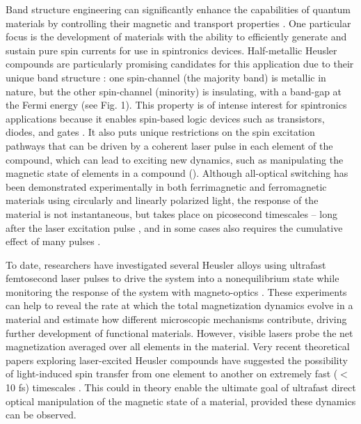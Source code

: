 Band structure engineering can significantly enhance the capabilities of quantum materials by controlling their magnetic and transport properties \cite{He2017,Klaer2009}. One particular focus is the development of materials with the ability to efficiently generate and sustain pure spin currents for use in spintronics devices. Half-metallic Heusler compounds are particularly promising candidates for this application due to their unique band structure \cite{Muller2009, Mann2012}: one spin-channel (the majority band) is metallic in nature, but the other spin-channel (minority) is insulating, with a band-gap at the Fermi energy (see Fig. 1). This property is of intense interest for spintronics applications because it enables spin-based logic devices such as transistors, diodes, and gates \cite{Prinz1995}. It also puts unique restrictions on the spin excitation pathways that can be driven by a coherent laser pulse in each element of the compound, which can lead to exciting new dynamics, such as manipulating the magnetic state of elements in a compound (\cite{Elliott2016,Steil2010}). Although all-optical switching has been demonstrated experimentally in both ferrimagnetic and ferromagnetic materials using circularly and linearly polarized light, the response of the material is not instantaneous, but takes place on picosecond timescales – long after the laser excitation pulse \cite{Kuiper2014}, and in some cases also requires the cumulative effect of many pulses \cite{Lambert2014,Mangin2014}.

To date, researchers have investigated several Heusler alloys using ultrafast femtosecond laser pulses to drive the system into a nonequilibrium state while monitoring the response of the system with magneto-optics \cite{Muller2009, Mann2012,Steil2010,Wustenberg2011}. These experiments can help to reveal the rate at which the total magnetization dynamics evolve in a material and estimate how different microscopic mechanisms contribute, driving further development of functional materials. However, visible lasers probe the net magnetization averaged over all elements in the material. Very recent theoretical papers exploring laser-excited Heusler compounds have suggested the possibility of light-induced spin transfer from one element to another on extremely fast ($<$10 fs) timescales \cite{Dewhurst2018,Elliott2016}. This could in theory enable the ultimate goal of ultrafast direct optical manipulation of the magnetic state of a material, provided these dynamics can be observed.

